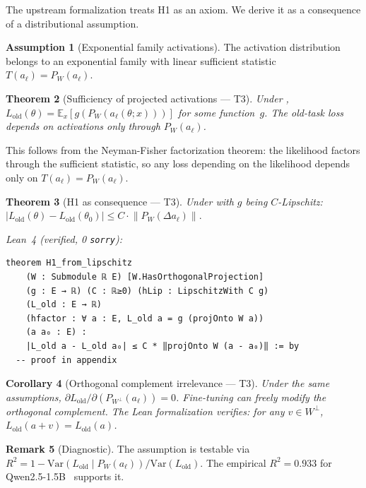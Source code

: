 \documentclass[11pt,a4paper]{article}
\newtheorem{theorem}{Theorem}[section]
\newtheorem{corollary}[theorem]{Corollary}
\theoremstyle{definition}
\newtheorem{assumption}[theorem]{Assumption}
\newtheorem{remark}[theorem]{Remark}
\newcommand{\E}{\mathbb{E}}
\newcommand{\Var}{\mathrm{Var}}
\newcommand{\proj}[1]{P_{#1}}
\newcommand{\norm}[1]{\left\|#1\right\|}
\newcommand{\abs}[1]{\left|#1\right|}
\begin{document}
The upstream formalization treats H1 as an axiom. We derive it as a consequence of a distributional assumption.

\begin{assumption}[Exponential family activations]
\label{asm:expfam}
The activation distribution belongs to an exponential family with linear sufficient statistic $T(a_\ell) = \proj{W}(a_\ell)$.
\end{assumption}

\begin{theorem}[Sufficiency of projected activations --- T3]
\label{thm:sufficiency}
Under , $L_{\mathrm{old}}(\theta) = \E_x[g(\proj{W}(a_\ell(\theta; x)))]$ for some function~$g$. The old-task loss depends on activations only through $\proj{W}(a_\ell)$.
\end{theorem}

This follows from the Neyman-Fisher factorization theorem: the likelihood factors through the sufficient statistic, so any loss depending on the likelihood depends only on $T(a_\ell) = \proj{W}(a_\ell)$.

\begin{theorem}[H1 as consequence --- T3]
\label{thm:h1}
Under  with $g$ being $C$-Lipschitz:
$\abs{L_{\mathrm{old}}(\theta) - L_{\mathrm{old}}(\theta_0)} \leq C \cdot \norm{\proj{W}(\Delta a_\ell)}.$
\end{theorem}

\noindent\textit{Lean~4 (verified, 0 \texttt{sorry}):}
\begin{lstlisting}[style=lean]
theorem H1_from_lipschitz
    (W : Submodule ℝ E) [W.HasOrthogonalProjection]
    (g : E → ℝ) (C : ℝ≥0) (hLip : LipschitzWith C g)
    (L_old : E → ℝ)
    (hfactor : ∀ a : E, L_old a = g (projOnto W a))
    (a a₀ : E) :
    |L_old a - L_old a₀| ≤ C * ‖projOnto W (a - a₀)‖ := by
  -- proof in appendix
\end{lstlisting}

\begin{corollary}[Orthogonal complement irrelevance --- T3]
Under the same assumptions, $\partial L_{\mathrm{old}} / \partial(\proj{W^\perp}(a_\ell)) = 0$. Fine-tuning can freely modify the orthogonal complement. The Lean formalization verifies: for any $v \in W^\perp$, $L_{\mathrm{old}}(a + v) = L_{\mathrm{old}}(a)$.
\end{corollary}

\begin{remark}[Diagnostic]
The assumption is testable via $R^2 = 1 - \Var(L_{\mathrm{old}} \mid \proj{W}(a_\ell)) / \Var(L_{\mathrm{old}})$. The empirical $R^2 = 0.933$ for Qwen2.5-1.5B~\citep{sfp2025} supports it.
\end{remark}
\end{document}

